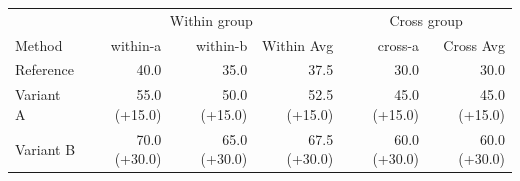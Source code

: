 \begin{tabular}{lrrrrr}
\toprule
 & \multicolumn{3}{c}{Within group} & \multicolumn{2}{c}{Cross group} \\
Method & within-a & within-b & Within Avg & cross-a & Cross Avg \\
\midrule
Reference & 40.0 & 35.0 & 37.5 & 30.0 & 30.0 \\
Variant A & 55.0 (+15.0) & 50.0 (+15.0) & 52.5 (+15.0) & 45.0 (+15.0) & 45.0 (+15.0) \\
Variant B & 70.0 (+30.0) & 65.0 (+30.0) & 67.5 (+30.0) & 60.0 (+30.0) & 60.0 (+30.0) \\
\bottomrule
\end{tabular}
